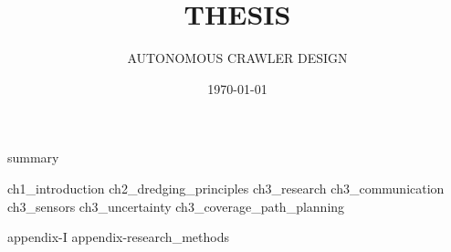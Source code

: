\documentclass[english, businessunit=mti, status=concept]{IHCreport}
\title{THESIS}
\subtitle{AUTONOMOUS CRAWLER DESIGN}
\date{\today}
\begin{document}

%
\begin{front}[]
 {summary}
\end{front}

\begin{main}
 {ch1_introduction}
 {ch2_dredging_principles}
 {ch3_research}
 {ch3_communication}
 {ch3_sensors}
 {ch3_uncertainty}
 {ch3_coverage_path_planning}
\end{main}

\begin{back}[]
 \printglossaries
 \printbibliography
 \begin{app}
  {appendix-I}
  {appendix-research_methods}
 \end{app}
\end{back}
\end{document}
